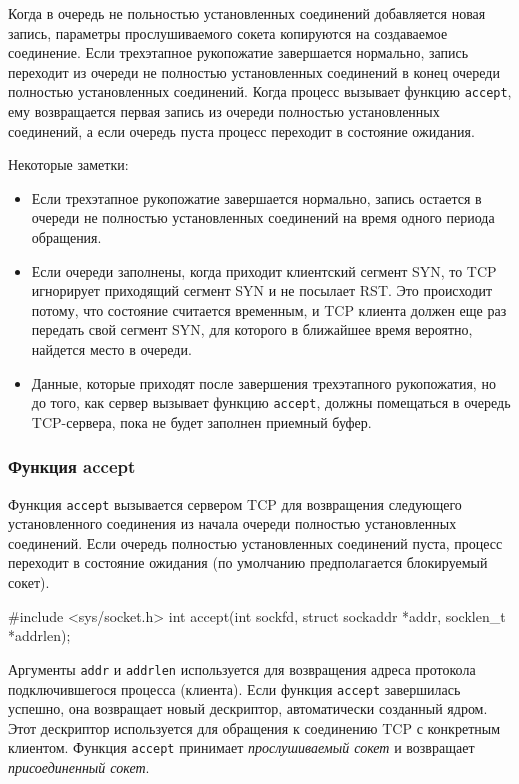 Когда в очередь не польностью установленных соединений добавляется новая запись, параметры прослушиваемого сокета копируются на создаваемое соединение. Если трехэтапное рукопожатие завершается нормально, запись переходит из очереди не полностью установленных соединений в конец очереди полностью установленных соединений. Когда процесс вызывает функцию \lstinline{accept}, ему возвращается первая запись из очереди полностью установленных соединений, а если очередь пуста процесс переходит в состояние ожидания.

Некоторые заметки:
\begin{itemize}
  \item Если трехэтапное рукопожатие завершается нормально, запись остается в очереди не полностью установленных соединений на время одного периода обращения.
  \item Если очереди заполнены, когда приходит клиентский сегмент SYN, то TCP игнорирует приходящий сегмент SYN и не посылает RST. Это происходит потому, что состояние считается временным, и TCP клиента должен еще раз передать свой сегмент SYN, для которого в ближайшее время вероятно, найдется место в очереди.
  \item Данные, которые приходят после завершения трехэтапного рукопожатия, но до того, как сервер вызывает функцию \lstinline{accept}, должны помещаться в очередь TCP-сервера, пока не будет заполнен приемный буфер.
\end{itemize}

\subsubsection{Функция accept}
Функция \lstinline{accept} вызывается сервером TCP для возвращения следующего установленного соединения из начала очереди полностью установленных соединений. Если очередь полностью установленных соединений пуста, процесс переходит в состояние ожидания (по умолчанию предполагается блокируемый сокет).
\begin{clst}{}{}
#include <sys/socket.h>
int accept(int sockfd, struct sockaddr *addr, socklen_t *addrlen);
\end{clst}

Аргументы \lstinline{addr} и \lstinline{addrlen} используется для возвращения адреса протокола подключившегося процесса (клиента). Если функция \lstinline{accept} завершилась успешно, она возвращает новый дескриптор, автоматически созданный ядром. Этот дескриптор используется для обращения к соединению TCP с конкретным клиентом. Функция \lstinline{accept} принимает \emph{прослушиваемый сокет} и возвращает \emph{присоединенный сокет}.

